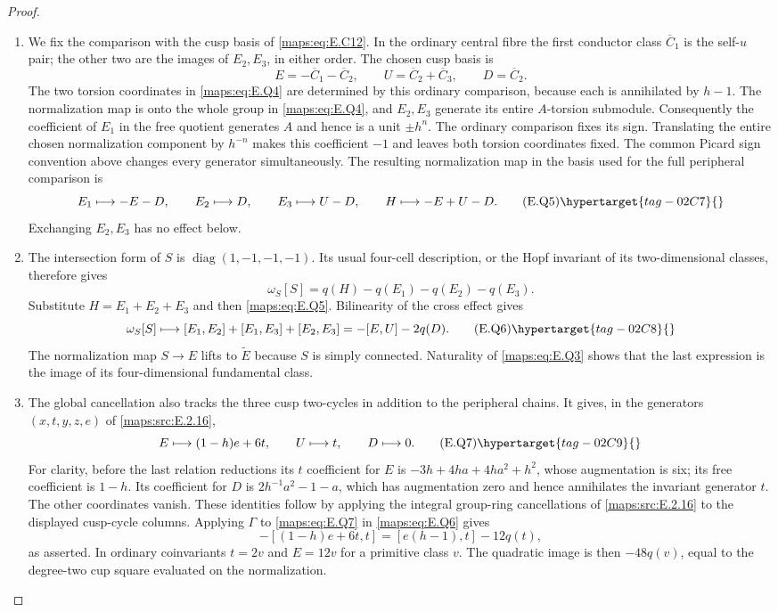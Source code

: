 \begin{proof}
\begin{enumerate}[label={$\langle1\rangle$\arabic*.},leftmargin=*]
\item We fix the comparison with the cusp basis of \eqref{maps:eq:E.C12}.  In the ordinary
central fibre the first conductor class $\overline C_1$ is the
self-$u$ pair; the other two are the images of $E_2,E_3$,
in either order.  The chosen cusp basis is
\[
 E=-\overline C_1-\overline C_2,\qquad
 U=\overline C_2+\overline C_3,\qquad D=\overline C_2.
\]
The two torsion coordinates in \eqref{maps:eq:E.Q4} are determined by
this ordinary comparison, because each is annihilated by
$h-1$.  The normalization map is onto the whole group in
\eqref{maps:eq:E.Q4}, and $E_2,E_3$ generate its entire $A$-torsion
submodule.  Consequently the coefficient of $E_1$ in the
free quotient generates $A$ and hence is a unit $\pm h^n$.  The ordinary comparison
fixes its sign.  Translating the entire chosen normalization
component by $h^{-n}$ makes this coefficient $-1$ and leaves
both torsion coordinates fixed.  The common Picard sign
convention above changes every generator simultaneously.
The resulting
normalization map in the basis used for the full peripheral
comparison is
\[
 E_1\longmapsto-E-D,\qquad
 E_2\longmapsto D,\qquad E_3\longmapsto U-D,
 \qquad H\longmapsto-E+U-D.
 \tag{E.Q5}\hypertarget{tag-02C7}{}\label{maps:eq:E.Q5}
\]
Exchanging $E_2,E_3$ has no effect below.  \item The intersection form of $S$ is
$\operatorname{diag}(1,-1,-1,-1)$.  Its usual four-cell
description, or the Hopf invariant of its two-dimensional
classes, therefore gives
\[
 \omega_S[S]=q(H)-q(E_1)-q(E_2)-q(E_3).
\]
Substitute $H=E_1+E_2+E_3$ and then \eqref{maps:eq:E.Q5}.  Bilinearity
of the cross effect gives
\[
 \omega_S[S]\longmapsto
 [E_1,E_2]+[E_1,E_3]+[E_2,E_3]
                      =-[E,U]-2q(D).
 \tag{E.Q6}\hypertarget{tag-02C8}{}\label{maps:eq:E.Q6}
\]
The normalization map $S\to E$ lifts to $\widetilde E$
because $S$ is simply connected.  Naturality of \eqref{maps:eq:E.Q3}
shows that the last expression is the image of its four-dimensional fundamental class.  \item The global cancellation also tracks the three cusp two-cycles in addition to the peripheral chains.  It gives, in the generators $(x,t,y,z,e)$ of
\ref{maps:src:E.2.16},
\[
 E\longmapsto(1-h)e+6t,\qquad
 U\longmapsto t,\qquad D\longmapsto0.
 \tag{E.Q7}\hypertarget{tag-02C9}{}\label{maps:eq:E.Q7}
\]
For clarity, before the last relation reductions its
$t$ coefficient for $E$ is
$-3h+4ha+4ha^2+h^2$, whose augmentation is six;
its free coefficient is $1-h$.  Its coefficient for $D$
is $2h^{-1}a^2-1-a$, which has augmentation zero and hence
annihilates the invariant generator $t$.  The other coordinates vanish. These identities follow by applying
the integral group-ring cancellations of \ref{maps:src:E.2.16} to
the displayed cusp-cycle columns.  Applying $\Gamma$ to \eqref{maps:eq:E.Q7} in \eqref{maps:eq:E.Q6} gives
\[
 -[(1-h)e+6t,t]
                =[e(h-1),t]-12q(t),
\]
as asserted.  In ordinary coinvariants $t=2v$ and
$E=12v$ for a primitive class $v$.  The quadratic image
is then $-48q(v)$, equal to the degree-two cup square evaluated
on the normalization.


\end{enumerate}
\end{proof}
